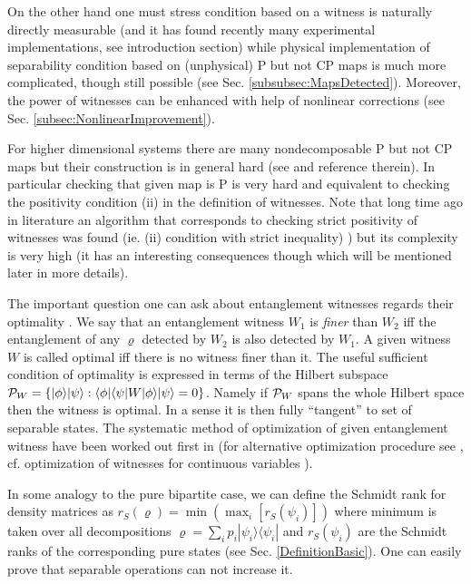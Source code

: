 \documentclass[rmp,12pt,preprint]{revtex4-2}
\begin{document}
On the other hand one must stress condition based on a witness is
naturally directly measurable \cite{Terhal2000-laa} (and it has found
recently many experimental implementations, see introduction section)
while physical implementation of separability condition based on
(unphysical) P but not CP maps is much more complicated, though still
possible (see Sec. \ref{subsubsec:MapsDetected}).  Moreover, the power
of witnesses can be enhanced with help of nonlinear corrections (see
Sec.  \ref{subsec:NonlinearImprovement}).

For higher dimensional systems there are many nondecomposable P but
not CP maps but their construction is in general hard (see
\cite{Kossakowski} and reference therein). In particular checking that
given map is P is very hard and equivalent to checking the positivity
condition (ii) in the definition of witnesses. Note that long time ago
in literature an algorithm that corresponds to checking strict
positivity of witnesses was found (ie. (ii) condition with strict
inequality) \cite{JamiolkowskiAlgorithm}) but its complexity is very
high (it has an interesting consequences though which will be
mentioned later in more details).

The important question one can ask about entanglement witnesses
regards their optimality \cite{Lewenstein00a,Lewenstein00b}.  We say
that an entanglement witness $W_{1}$ is {\it finer} than $W_{2}$ iff
the entanglement of any $\varrho$ detected by $W_{2}$ is also detected
by $W_{1}$. A given witness $W$ is called optimal iff there is no
witness finer than it. The useful sufficient condition of optimality
\cite{Lewenstein00a} is expressed in terms of the Hilbert subspace
${\cal P}_{W}=\{ |\phi\rangle|\psi\rangle : \langle \phi|\langle\psi
|W|\phi\rangle|\psi\rangle=0\}$. Namely if ${\cal P}_{W}$ spans the
whole Hilbert space then the witness is optimal. In a sense it is then
fully ``tangent'' to set of separable states. The systematic method of
optimization of given entanglement witness have been worked out first
in \cite{Lewenstein00a,Lewenstein00b} (for alternative optimization
procedure see \cite{EisertAlgorithm}, cf.  optimization of witnesses
for continuous variables \cite{EisertCVNonlinearWitnesses}).

In some analogy to the pure bipartite case, we can define the Schmidt
rank for density matrices \cite{Terhal-Pawel-rank} as $r_{S}(\varrho)=
\min(\max_{i}[r_{S}(\psi_{i})])$ where minimum is taken over all
decompositions $\varrho=\sum_{i}p_{i}|\psi_{i}\rangle \langle
\psi_{i}|$ and $r_{S}(\psi_{i})$ are the Schmidt ranks of the
corresponding pure states (see Sec. \ref{DefinitionBasic}).  One can
easily prove that separable operations can not increase it.
\end{document}
